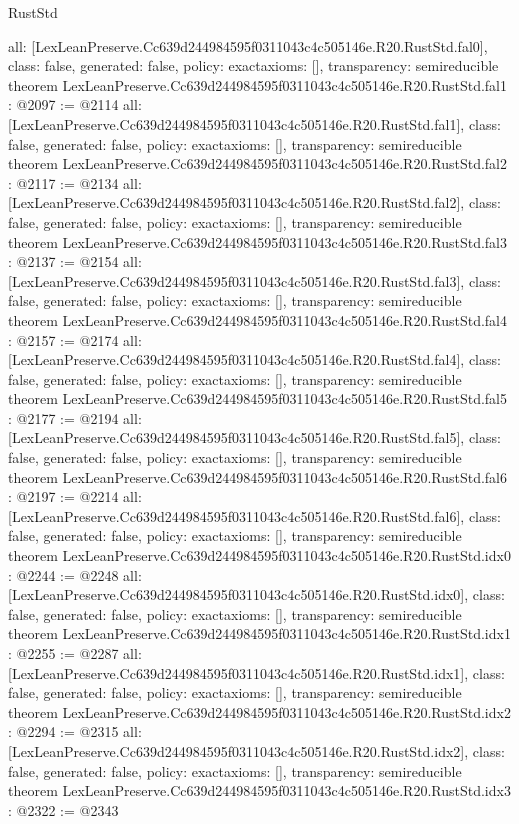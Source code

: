\begin{lexlean}{RustStd}
\begin{coremodule}
{  all: [LexLeanPreserve.Cc639d244984595f0311043c4c505146e.R20.RustStd.fal0],
  class: false,
  generated: false,
  policy: exact{axioms: []},
  transparency: semireducible
}
theorem LexLeanPreserve.Cc639d244984595f0311043c4c505146e.R20.RustStd.fal1 : @2097 := @2114 {
  all: [LexLeanPreserve.Cc639d244984595f0311043c4c505146e.R20.RustStd.fal1],
  class: false,
  generated: false,
  policy: exact{axioms: []},
  transparency: semireducible
}
theorem LexLeanPreserve.Cc639d244984595f0311043c4c505146e.R20.RustStd.fal2 : @2117 := @2134 {
  all: [LexLeanPreserve.Cc639d244984595f0311043c4c505146e.R20.RustStd.fal2],
  class: false,
  generated: false,
  policy: exact{axioms: []},
  transparency: semireducible
}
theorem LexLeanPreserve.Cc639d244984595f0311043c4c505146e.R20.RustStd.fal3 : @2137 := @2154 {
  all: [LexLeanPreserve.Cc639d244984595f0311043c4c505146e.R20.RustStd.fal3],
  class: false,
  generated: false,
  policy: exact{axioms: []},
  transparency: semireducible
}
theorem LexLeanPreserve.Cc639d244984595f0311043c4c505146e.R20.RustStd.fal4 : @2157 := @2174 {
  all: [LexLeanPreserve.Cc639d244984595f0311043c4c505146e.R20.RustStd.fal4],
  class: false,
  generated: false,
  policy: exact{axioms: []},
  transparency: semireducible
}
theorem LexLeanPreserve.Cc639d244984595f0311043c4c505146e.R20.RustStd.fal5 : @2177 := @2194 {
  all: [LexLeanPreserve.Cc639d244984595f0311043c4c505146e.R20.RustStd.fal5],
  class: false,
  generated: false,
  policy: exact{axioms: []},
  transparency: semireducible
}
theorem LexLeanPreserve.Cc639d244984595f0311043c4c505146e.R20.RustStd.fal6 : @2197 := @2214 {
  all: [LexLeanPreserve.Cc639d244984595f0311043c4c505146e.R20.RustStd.fal6],
  class: false,
  generated: false,
  policy: exact{axioms: []},
  transparency: semireducible
}
theorem LexLeanPreserve.Cc639d244984595f0311043c4c505146e.R20.RustStd.idx0 : @2244 := @2248 {
  all: [LexLeanPreserve.Cc639d244984595f0311043c4c505146e.R20.RustStd.idx0],
  class: false,
  generated: false,
  policy: exact{axioms: []},
  transparency: semireducible
}
theorem LexLeanPreserve.Cc639d244984595f0311043c4c505146e.R20.RustStd.idx1 : @2255 := @2287 {
  all: [LexLeanPreserve.Cc639d244984595f0311043c4c505146e.R20.RustStd.idx1],
  class: false,
  generated: false,
  policy: exact{axioms: []},
  transparency: semireducible
}
theorem LexLeanPreserve.Cc639d244984595f0311043c4c505146e.R20.RustStd.idx2 : @2294 := @2315 {
  all: [LexLeanPreserve.Cc639d244984595f0311043c4c505146e.R20.RustStd.idx2],
  class: false,
  generated: false,
  policy: exact{axioms: []},
  transparency: semireducible
}
theorem LexLeanPreserve.Cc639d244984595f0311043c4c505146e.R20.RustStd.idx3 : @2322 := @2343 {
}
\end{coremodule}
\end{lexlean}
